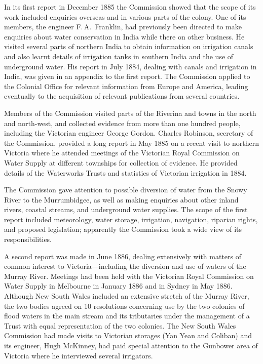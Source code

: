 In its first report in December 1885 the Commission showed that the
scope of its work included enquiries overseas and in various parts of
the colony.  One of its members, the engineer F.\,A.~Franklin, had
previously been directed to make enquiries about water conservation in
India while there on other business.  He visited several parts of
northern India to obtain information on irrigation canals and also
learnt details of irrigation tanks in southern India and the use of
underground water.  His report in July 1884, dealing with canals and
irrigation in India, was given in an appendix to the first
report.  The Commission applied to the Colonial Office for relevant
information from Europe and America, leading eventually to the
acquisition of relevant publications from several countries.

Members of the Commission visited parts of the Riverina and towns in
the north and north-west, and collected evidence from more than one
hundred people, including the Victorian engineer George Gordon.
Charles Robinson, secretary of the Commission, provided a long report
in May 1885 on a recent visit to northern Victoria where he attended
meetings of the Victorian Royal Commission on Water Supply at
different townships for collection of evidence. He provided details of
the Waterworks Trusts and statistics of Victorian irrigation in
1884.

The Commission gave attention to possible diversion of water from the
Snowy River to the Murrumbidgee, as well as making enquiries about
other inland rivers, coastal streams, and underground water supplies.
The scope of the first report included meteorology, water storage,
irrigation, navigation, riparian rights, and proposed legislation;
apparently the Commission took a wide view of its responsibilities.

A second report was made in June 1886, dealing extensively with
matters of common interest to Victoria---including the diversion and
use of waters of the Murray River.  Meetings had been held with the
Victorian Royal Commission on Water Supply in Melbourne in January
1886 and in Sydney in May 1886.  Although New South Wales included an
extensive stretch of the Murray River, the two bodies agreed on 10
resolutions concerning use by the two colonies of flood waters in the
main stream and its tributaries under the management of a Trust with
equal representation of the two colonies.  The New South Wales
Commission had made visits to Victorian storages (Yan Yean and
Coliban) and its engineer, Hugh McKinney, had paid special attention
to the Gunbower area of Victoria where he interviewed several
irrigators.

